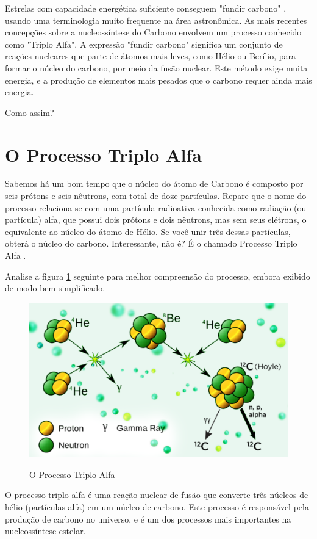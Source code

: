 \documentclass[a4paper,12pt]{book}
\begin{document}
Estrelas com capacidade energética suficiente conseguem "fundir carbono" , usando uma terminologia muito frequente na área astronômica. As mais recentes concepções sobre a nucleossíntese do Carbono envolvem um processo conhecido como "Triplo Alfa". A expressão "fundir carbono" significa um conjunto de reações nucleares que parte de átomos mais leves, como Hélio ou Berílio, para formar o núcleo do carbono, por meio da fusão nuclear. Este método exige muita energia, e a produção de elementos mais pesados que o carbono requer ainda mais energia.

Como assim?

\section{O Processo Triplo Alfa}

Sabemos há um bom tempo que o núcleo do átomo de Carbono é composto por seis prótons e seis nêutrons, com total de doze partículas. Repare que o nome do processo relaciona-se com uma partícula radioativa conhecida como radiação (ou partícula) alfa, que possui dois prótons e dois nêutrons, mas sem seus elétrons, o equivalente ao núcleo do átomo de Hélio. Se você unir três dessas partículas, obterá o núcleo do carbono. Interessante, não é? É o chamado Processo Triplo Alfa  \cite{TA}.

Analise a figura \ref{fig:triploalfa} seguinte para melhor compreensão do processo, embora exibido de modo bem simplificado.

\begin{figure}[h]
	\centering
	\caption{O Processo Triplo Alfa}
	\vspace{0.25cm}
	\includegraphics[width=0.75\linewidth]{imagens/figura 2.png} 
	\label{fig:triploalfa}
\end{figure}

O processo triplo alfa é uma reação nuclear de fusão que converte três núcleos de hélio (partículas alfa) em um núcleo de carbono. Este processo é responsável pela produção de carbono no universo, e é um dos processos mais importantes na nucleossíntese estelar.
\end{document}
